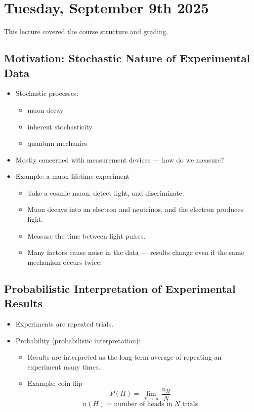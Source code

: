 \section{Tuesday, September 9th 2025}

This lecture covered the course structure and grading.

\subsection{Motivation: Stochastic Nature of Experimental Data}

\begin{itemize}
      \item Stochastic processes:
            \begin{itemize}
                  \item muon decay
                  \item inherent stochasticity
                  \item quantum mechanics
            \end{itemize}
      \item Mostly concerned with measurement devices — how do we measure?
      \item Example: a muon lifetime experiment
            \begin{itemize}
                  \item Take a cosmic muon, detect light, and discriminate.
                  \item Muon decays into an electron and neutrinos, and the electron produces light.
                  \item Measure the time between light pulses.
                  \item Many factors cause noise in the data — results change even if the same mechanism occurs twice.
            \end{itemize}
\end{itemize}

\subsection{Probabilistic Interpretation of Experimental Results}

\begin{itemize}
      \item Experiments are repeated trials.
      \item Probability (probabilistic interpretation):
            \begin{itemize}
                  \item Results are interpreted as the long-term average of repeating an experiment many times.
                  \item Example: coin flip
                        \[ P(H) = \lim_{N\to\infty} \frac{n_H}{N} \]
                        \[ n(H) = \text{number of heads in $N$ trials} \]
            \end{itemize}
\end{itemize}

